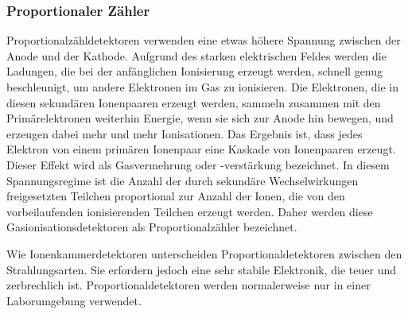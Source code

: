 {\subsubsection{Proportionaler Zähler}
Proportionalzähldetektoren verwenden eine etwas höhere Spannung zwischen der Anode und der Kathode. Aufgrund des starken elektrischen Feldes werden die Ladungen, die bei der anfänglichen Ionisierung erzeugt werden, schnell genug beschleunigt, um andere Elektronen im Gas zu ionisieren. Die Elektronen, die in diesen sekundären Ionenpaaren erzeugt werden, sammeln zusammen mit den Primärelektronen weiterhin Energie, wenn sie sich zur Anode hin bewegen, und erzeugen dabei mehr und mehr Ionisationen. Das Ergebnis ist, dass jedes Elektron von einem primären Ionenpaar eine Kaskade von Ionenpaaren erzeugt. Dieser Effekt wird als Gasvermehrung oder -verstärkung bezeichnet. In diesem Spannungsregime ist die Anzahl der durch sekundäre Wechselwirkungen freigesetzten Teilchen proportional zur Anzahl der Ionen, die von den vorbeilaufenden ionisierenden Teilchen erzeugt werden. Daher werden diese Gasionisationsdetektoren als Proportionalzähler bezeichnet.

Wie Ionenkammerdetektoren unterscheiden Proportionaldetektoren zwischen den Strahlungsarten. Sie erfordern jedoch eine sehr stabile Elektronik, die teuer und zerbrechlich ist. Proportionaldetektoren werden normalerweise nur in einer Laborumgebung verwendet.

}
